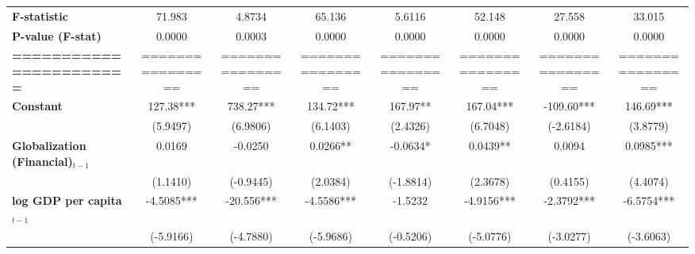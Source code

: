 \begin{center}
\begin{tabular}{lccccccc}
\textbf{F-statistic}               &        71.983        &            4.8734           &            65.136            &                5.6116               &              52.148              &            27.558           &             33.015             \\
\textbf{P-value (F-stat)}          &        0.0000        &            0.0003           &            0.0000            &                0.0000               &              0.0000              &            0.0000           &             0.0000             \\
\textbf{=======================}   &   ================   &       ================      &       ================       &           ================          &         ================         &       ================      &        ================        \\
\textbf{Constant}                     &      127.38***       &          738.27***          &          134.72***           &               167.97**              &            167.04***             &          -109.60***         &           146.69***            \\
\textbf{ }                         &       (5.9497)       &           (6.9806)          &           (6.1403)           &               (2.4326)              &             (6.7048)             &          (-2.6184)          &            (3.8779)            \\
\textbf{Globalization (Financial)$_{t-1}$}             &        0.0169        &           -0.0250           &           0.0266**           &               -0.0634*              &             0.0439**             &            0.0094           &           0.0985***            \\
\textbf{ }                         &       (1.1410)       &          (-0.9445)          &           (2.0384)           &              (-1.8814)              &             (2.3678)             &           (0.4155)          &            (4.4074)            \\
\textbf{log GDP per capita$_{t-1}$}           &      -4.5085***      &          -20.556***         &          -4.5586***          &               -1.5232               &            -4.9156***            &          -2.3792***         &           -6.5754***           \\
\textbf{ }                         &      (-5.9166)       &          (-4.7880)          &          (-5.9686)           &              (-0.5206)              &            (-5.0776)             &          (-3.0277)          &           (-3.6063)            \\

\end{tabular}
\end{center}
